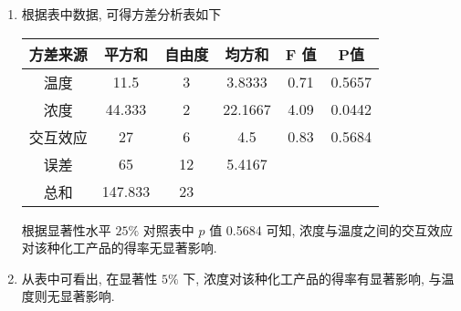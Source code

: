 \begin{enumerate}[(1)]
    \item 根据表中数据, 可得方差分析表如下
    \begin{center}
    \begin{tabular}{c|c|c|cc|c}
    \hline
    方差来源 & 平方和     & 自由度 & \multicolumn{1}{c|}{均方和}     & F 值  & P值     \\ \hline
    温度   & 11.5    & 3   & \multicolumn{1}{c|}{3.8333}  & 0.71 & 0.5657 \\
    浓度   & 44.333  & 2   & \multicolumn{1}{c|}{22.1667} & 4.09 & 0.0442 \\
    交互效应 & 27      & 6   & \multicolumn{1}{c|}{4.5}     & 0.83 & 0.5684 \\
    误差   & 65      & 12  & \multicolumn{1}{c|}{5.4167}  &      &        \\ \hline
    总和   & 147.833 & 23  &                              &      &        \\ \hline
    \end{tabular}
    \end{center}
根据显著性水平 $25\%$ 对照表中 $p$ 值 0.5684 可知, 浓度与温度之间的交互效应对该种化工产品的得率无显著影响. 
\item 从表中可看出, 在显著性 $5\%$ 下, 浓度对该种化工产品的得率有显著影响, 与温度则无显著影响.
\end{enumerate}

\vspace{12pt}

